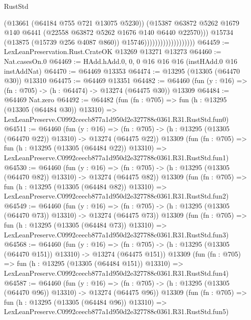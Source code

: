 \begin{lexlean}{RustStd}
\begin{coremodule}
                                            (@13661 (@64184 @755 @721 @13075 @5230))
                                            (@15387
                                              @63872
                                              @5262
                                              @1679
                                              @140
                                              @6441
                                              (@22558 @63872 @5262 @1676 @140 @6440 @22570)))
                                          @15734
                                          (@13875 (@15739 @256 @4087 @860))
                                          @15746)))))))))))))))))))
@64459 := LexLeanPreservation.Rust.CrateOK @13269 @13271 @13273
@64460 := Nat.casesOn.{0}
@64469 := HAdd.hAdd.{0, 0, 0} @16 @16 @16 (instHAdd.{0} @16 instAddNat)
@64470 := @64469 @13353
@64474 := @13295 (@13305 (@64470 @30)) @13310
@64475 := @64469 @13351
@64482 := @64460 (fun (y : @16) => (fn : @705) -> (h : @64474) -> @13274 (@64475 @30)) @13309
@64484 := @64469 Nat.zero
@64492 := @64482
    (fun (fn : @705) =>
    fun (h : @13295 (@13305 (@64484 @30)) @13310) =>
    LexLeanPreserve.C0992ceecb877a1d950d2e327788c0361.R31.RustStd.fun0)
@64511 := @64460
    (fun (y : @16) =>
    (fn : @705) -> (h : @13295 (@13305 (@64470 @22)) @13310) -> @13274 (@64475 @22))
    @13309
    (fun (fn : @705) =>
    fun (h : @13295 (@13305 (@64484 @22)) @13310) =>
    LexLeanPreserve.C0992ceecb877a1d950d2e327788c0361.R31.RustStd.fun1)
@64530 := @64460
    (fun (y : @16) =>
    (fn : @705) -> (h : @13295 (@13305 (@64470 @82)) @13310) -> @13274 (@64475 @82))
    @13309
    (fun (fn : @705) =>
    fun (h : @13295 (@13305 (@64484 @82)) @13310) =>
    LexLeanPreserve.C0992ceecb877a1d950d2e327788c0361.R31.RustStd.fun2)
@64549 := @64460
    (fun (y : @16) =>
    (fn : @705) -> (h : @13295 (@13305 (@64470 @73)) @13310) -> @13274 (@64475 @73))
    @13309
    (fun (fn : @705) =>
    fun (h : @13295 (@13305 (@64484 @73)) @13310) =>
    LexLeanPreserve.C0992ceecb877a1d950d2e327788c0361.R31.RustStd.fun3)
@64568 := @64460
    (fun (y : @16) =>
    (fn : @705) -> (h : @13295 (@13305 (@64470 @151)) @13310) -> @13274 (@64475 @151))
    @13309
    (fun (fn : @705) =>
    fun (h : @13295 (@13305 (@64484 @151)) @13310) =>
    LexLeanPreserve.C0992ceecb877a1d950d2e327788c0361.R31.RustStd.fun4)
@64587 := @64460
    (fun (y : @16) =>
    (fn : @705) -> (h : @13295 (@13305 (@64470 @96)) @13310) -> @13274 (@64475 @96))
    @13309
    (fun (fn : @705) =>
    fun (h : @13295 (@13305 (@64484 @96)) @13310) =>
    LexLeanPreserve.C0992ceecb877a1d950d2e327788c0361.R31.RustStd.fun5)

\end{coremodule}
\end{lexlean}
